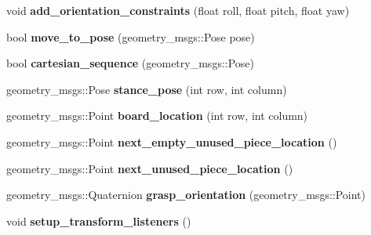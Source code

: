 \begin{DoxyCompactItemize}
\mbox{\label{classgo__motion__planner_a14a615472cc4daae8049627c4aacf1e2}} 
void {\bfseries add\+\_\+orientation\+\_\+constraints} (float roll, float pitch, float yaw)
\item 
\mbox{\label{classgo__motion__planner_a2be951f1c56888d0e710290c884a6050}} 
bool {\bfseries move\+\_\+to\+\_\+pose} (geometry\+\_\+msgs\+::\+Pose pose)
\item 
\mbox{\label{classgo__motion__planner_a0c8a279562b60fd12202452f09d5b149}} 
bool {\bfseries cartesian\+\_\+sequence} (geometry\+\_\+msgs\+::\+Pose)
\item 
\mbox{\label{classgo__motion__planner_a2120e26233b9622d9af923f7649b73fe}} 
geometry\+\_\+msgs\+::\+Pose {\bfseries stance\+\_\+pose} (int row, int column)
\item 
\mbox{\label{classgo__motion__planner_a26ec310b72222bc827f595e94ada0719}} 
geometry\+\_\+msgs\+::\+Point {\bfseries board\+\_\+location} (int row, int column)
\item 
\mbox{\label{classgo__motion__planner_a7ca51ab871bab4e80b208587b1c8ee45}} 
geometry\+\_\+msgs\+::\+Point {\bfseries next\+\_\+empty\+\_\+unused\+\_\+piece\+\_\+location} ()
\item 
\mbox{\label{classgo__motion__planner_ac70899ea0cb646a112c51f9a056fa4b1}} 
geometry\+\_\+msgs\+::\+Point {\bfseries next\+\_\+unused\+\_\+piece\+\_\+location} ()
\item 
\mbox{\label{classgo__motion__planner_aa8f5de4110bd29391e00b26eda2a5bcc}} 
geometry\+\_\+msgs\+::\+Quaternion {\bfseries grasp\+\_\+orientation} (geometry\+\_\+msgs\+::\+Point)
\item 
\mbox{\label{classgo__motion__planner_a88298290e78a2b4445d7026785d04760}} 
void {\bfseries setup\+\_\+transform\+\_\+listeners} ()
\item 
\mbox{\label{classgo__motion__planner_a364274097d4ea459a6e18a17852e9704}} 

\end{DoxyCompactItemize}
